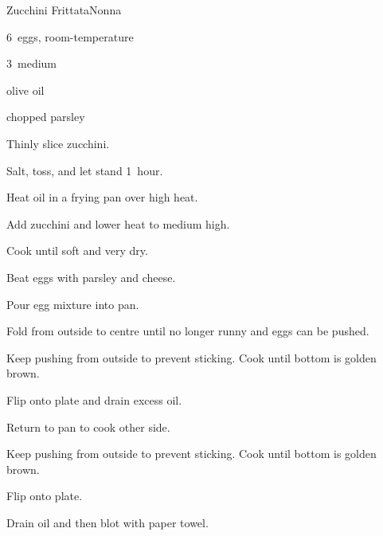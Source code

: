 \begin{recipe}{Zucchini Frittata}{Nonna}{}

\begin{ingredients}
\item 6~eggs, room-temperature
\item 3~medium 
\item olive oil
\item chopped parsley
\item \C{\half} 
\end{ingredients}

\begin{directions}
\item Thinly slice zucchini.
\item Salt, toss, and let stand 1~hour.
\item Heat oil in a  frying pan over high heat.
\item Add zucchini and lower heat to medium high.
\item Cook until soft and very dry.
\item Beat eggs with parsley and cheese.
\item Pour egg mixture into pan.
\item Fold from outside to centre until no longer runny and eggs can be pushed.
\item Keep pushing from outside to prevent sticking. Cook until bottom is golden brown.
\item Flip onto plate and drain excess oil.
\item Return to pan to cook other side.
\item Keep pushing from outside to prevent sticking. Cook until bottom is golden brown.
\item Flip onto plate.
\item Drain oil and then blot with paper towel.
\end{directions}

\end{recipe}
